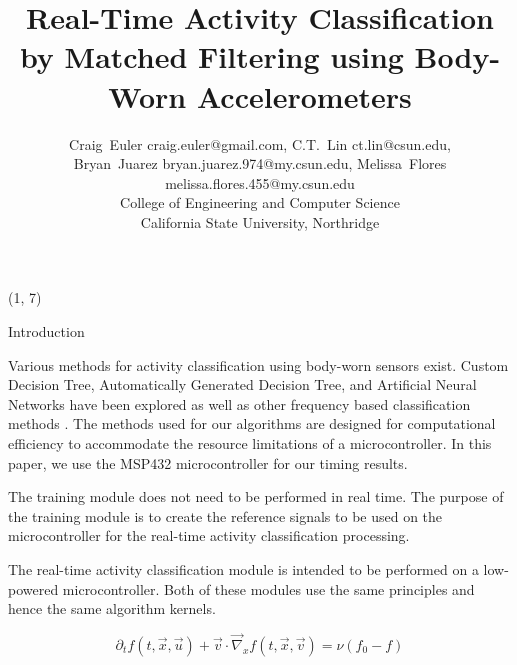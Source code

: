 \documentclass[unknownkeysallowed,final]{beamer}
\title{\normalsize{Real-Time Activity Classification by Matched Filtering using Body-Worn Accelerometers}}
\author{\small{Craig~Euler craig.euler@gmail.com, C.T.~Lin ct.lin@csun.edu,\\Bryan~Juarez bryan.juarez.974@my.csun.edu, Melissa~Flores melissa.flores.455@my.csun.edu\\College of Engineering and Computer Science\\California State University, Northridge}}
\date{}
\begin{document}
\tiny{}
\begin{frame}{} 

\begin{textblock}{19.5}(1, 7)

\begin{block}{\small{Introduction}}



Various methods for activity classification using body-worn sensors exist.
Custom Decision Tree, Automatically Generated Decision Tree, and Artificial Neural Networks \cite{parkka_ermes_korpipaa_mantyjarvi_peltola_korhonen_2006} have been explored as well as other frequency based classification methods \cite{sharma_purwar_lee_lee_chung_2008}.
The methods used for our algorithms are designed for computational efficiency to accommodate the resource limitations of a microcontroller. In this paper, we use the MSP432 microcontroller for our timing results.


The training module does not need to be performed in real time.
The purpose of the training module is to create the reference signals to be used on the microcontroller for the real-time activity classification processing.

The real-time activity classification module is intended to be performed on a low-powered microcontroller.
Both of these modules use the same principles and hence the same algorithm kernels.



\begin{equation*}
\label{ES-BGK}
\partial_{t} f(t, \vec{x}, \vec{u}) + \vec{v} \cdot \vec{\nabla}_{x} f(t, \vec{x}, \vec{v}) = \nu (f_{0} - f)
\end{equation*}


\end{block}
\end{textblock}
\end{frame}
\end{document}
